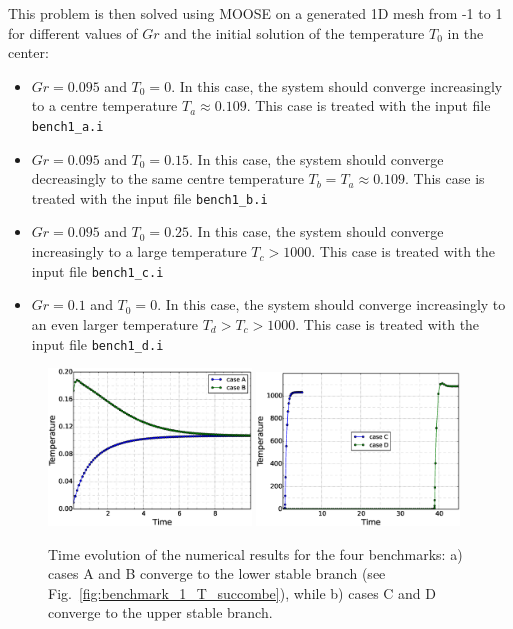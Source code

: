 \documentclass[]{scrreprt}
\newcommand{\moose}{{MOOSE}}
\begin{document}
This problem is then solved using \moose{} on a generated 1D mesh from -1 to 1 for different values of $Gr$ and the initial solution of the temperature $T_0$ in the center:
\begin{itemize}
\item $Gr=0.095$ and $T_0=0$. In this case, the system should converge increasingly to a centre temperature $T_a\approx0.109$. This case is treated with the input file \texttt{bench1\_a.i} 
\item $Gr=0.095$ and $T_0=0.15$. In this case, the system should converge decreasingly to the same centre temperature $T_b=T_a\approx0.109$. This case is treated with the input file \texttt{bench1\_b.i} 
\item $Gr=0.095$ and $T_0=0.25$. In this case, the system should converge increasingly to a large temperature $T_c>1000$. This case is treated with the input file \texttt{bench1\_c.i} 
\item $Gr=0.1$ and $T_0=0$. In this case, the system should converge increasingly to an even larger temperature $T_d>T_c>1000$. This case is treated with the input file \texttt{bench1\_d.i} 
\end{itemize}

\begin{figure}
  \centering
  \includegraphics[width=0.48\textwidth]{benchmark_1_T_results_A_B.eps}
  \includegraphics[width=0.48\textwidth]{benchmark_1_T_results_C_D.eps}
  \caption{Time evolution of the numerical results for the four benchmarks: a) cases A and B converge to the lower stable branch (see Fig.~\ref{fig:benchmark_1_T_succombe}), while b) cases C and D converge to the upper stable branch.}
  \label{fig:benchmark_1_T_results}
\end{figure}
\end{document}
